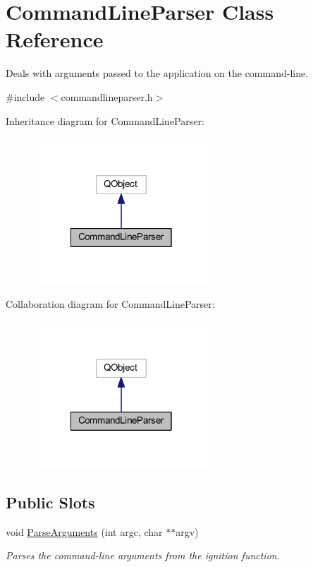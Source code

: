 \hypertarget{class_command_line_parser}{\section{Command\-Line\-Parser Class Reference}
\label{class_command_line_parser}
}


Deals with arguments passed to the application on the command-\/line.  




{\ttfamily \#include $<$commandlineparser.\-h$>$}



Inheritance diagram for Command\-Line\-Parser\-:
\nopagebreak
\begin{figure}[H]
\begin{center}
\leavevmode
\includegraphics[width=186pt]{class_command_line_parser__inherit__graph}
\end{center}
\end{figure}


Collaboration diagram for Command\-Line\-Parser\-:
\nopagebreak
\begin{figure}[H]
\begin{center}
\leavevmode
\includegraphics[width=186pt]{class_command_line_parser__coll__graph}
\end{center}
\end{figure}
\subsection*{Public Slots}
\begin{DoxyCompactItemize}
\item 
void \hyperlink{class_command_line_parser_a6a39c14ecf639b02bf8a71ac224b0a61}{Parse\-Arguments} (int argc, char $\ast$$\ast$argv)
\begin{DoxyCompactList}\small\item\em Parses the command-\/line arguments from the ignition function. \end{DoxyCompactList}\end{DoxyCompactItemize}
